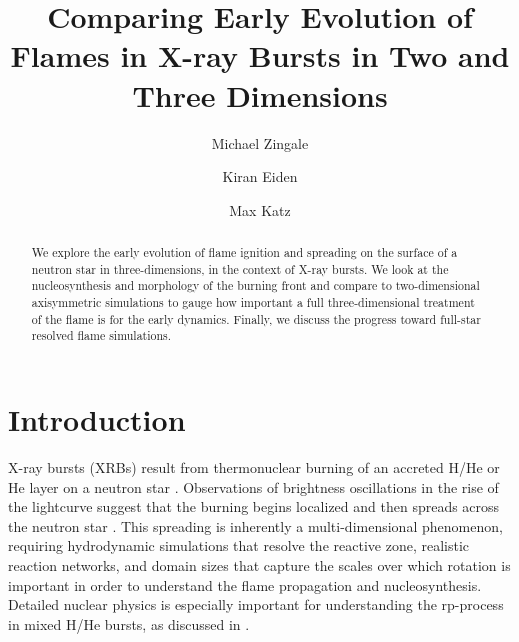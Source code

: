 \documentclass[linenumbers,trackchanges]{aastex631}
\begin{document}
\title{Comparing Early Evolution of Flames in X-ray Bursts in Two and Three Dimensions}


\author[0000-0001-8401-030X]{Michael Zingale}

\author[0000-0001-6191-4285]{Kiran Eiden}

\author[0000-0003-0439-4556]{Max Katz}




\begin{abstract}
We explore the early evolution of flame ignition and spreading on the
surface of a neutron star in three-dimensions, in the context of X-ray
bursts.  We look at the nucleosynthesis and morphology of the burning
front and compare to two-dimensional axisymmetric simulations to gauge
how important a full three-dimensional treatment of the flame is for
the early dynamics.  Finally, we discuss the progress toward full-star
resolved flame simulations.\end{abstract}


\section{Introduction}\label{Sec:Introduction}

X-ray bursts (XRBs) result from thermonuclear burning of an accreted
H/He or He layer on a neutron star \citep{galloway:2017}.
Observations of brightness oscillations in the rise of the lightcurve
suggest that the burning begins localized and then spreads across the
neutron star \citep{bhattacharyya:2007}. 
This spreading is inherently
a multi-dimensional phenomenon, requiring hydrodynamic simulations that
resolve the reactive zone, realistic reaction networks, and
domain sizes that capture the scales over which rotation is important in order to
understand the flame propagation and nucleosynthesis.  Detailed
nuclear physics is especially important for understanding the 
rp-process in mixed H/He bursts, as discussed in \citet{rpprocess}.
\end{document}
